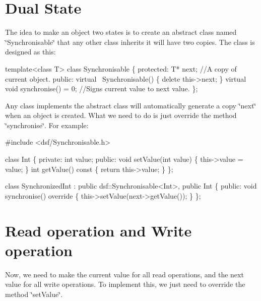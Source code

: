 \hypertarget{_implementation_ImplementationDualState}{}\section{Dual State}\label{_implementation_ImplementationDualState}
The idea to make an object two states is to create an abstract class named \char`\"{}\+Synchronisable\char`\"{} that any other class inherits it will have two copies. The class is designed as this\+: 
\begin{DoxyCode}
\textcolor{keyword}{template}<\textcolor{keyword}{class} T> \textcolor{keyword}{class }Synchronisable
\{
\textcolor{keyword}{protected}:
    T* next; \textcolor{comment}{//A copy of current object.}
\textcolor{keyword}{public}:
    \textcolor{keyword}{virtual} ~Synchronisable() \{
        \textcolor{keyword}{delete} this->next;
    \}
    \textcolor{keyword}{virtual} \textcolor{keywordtype}{void} synchronise() = 0; \textcolor{comment}{//Signs current value to next value.}
\};
\end{DoxyCode}
 Any class implements the abstract class will automatically generate a copy \char`\"{}next\char`\"{} when an object is created. What we need to do is just override the method \char`\"{}synchronise\char`\"{}. For example\+: 
\begin{DoxyCode}
\textcolor{preprocessor}{#include <dsf/Synchronisable.h>}

\textcolor{keyword}{class }Int
\{
\textcolor{keyword}{private}:
    \textcolor{keywordtype}{int} value;
\textcolor{keyword}{public}:
    \textcolor{keywordtype}{void} setValue(\textcolor{keywordtype}{int} value)
    \{
        this->value = value;
    \}
    \textcolor{keywordtype}{int} getValue()\textcolor{keyword}{ const}
\textcolor{keyword}{    }\{
        \textcolor{keywordflow}{return} this->value;
    \}
\};

\textcolor{keyword}{class }SynchronizedInt : \textcolor{keyword}{public} dsf::Synchronisable<Int>, \textcolor{keyword}{public} Int
\{
\textcolor{keyword}{public}:
    \textcolor{keywordtype}{void} synchronise()\textcolor{keyword}{ override}
\textcolor{keyword}{    }\{
        this->setValue(next->getValue());
    \}
\};
\end{DoxyCode}
\hypertarget{_implementation_Implementationrnd}{}\section{Read operation and Write operation}\label{_implementation_Implementationrnd}
Now, we need to make the current value for all read operations, and the next value for all write operations. To implement this, we just need to override the method \char`\"{}set\+Value\char`\"{}. 
